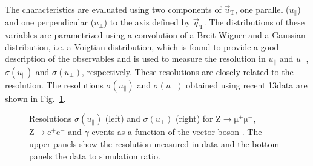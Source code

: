 The \MET characteristics are evaluated using two components of $\vec{u}_\mathrm{T}$, one parallel ($u_\parallel$) and one perpendicular ($u_\perp$) to the axis defined by $\vec{q}_\mathrm{T}$. The distributions of these variables are parametrized using a convolution of a Breit-Wigner and a Gaussian distribution, i.e. a Voigtian distribution, which is found to provide a good description of the observables and is used to measure the resolution in $u_\parallel$ and $u_\perp$, $\sigma(u_\parallel)$ and $\sigma(u_\perp)$, respectively. These resolutions are closely related to the \MET resolution. The resolutions $\sigma(u_\parallel)$ and $\sigma(u_\perp)$ obtained using recent 13\TeV data are shown in Fig.~\ref{fig:metres}.

\begin{figure}[htb]
\centering
{}
\caption{Resolutions $\sigma(u_\parallel)$ (left) and $\sigma(u_\perp)$ (right) for $\mathrm{Z\to\mu^+\mu^-}$, $\mathrm{Z\to e^+ e^-}$ and $\gamma$ events as a function of the vector boson \pt. The upper panels show the resolution measured in data and the bottom panels the data to simulation ratio.}\label{fig:metres}
\end{figure}

